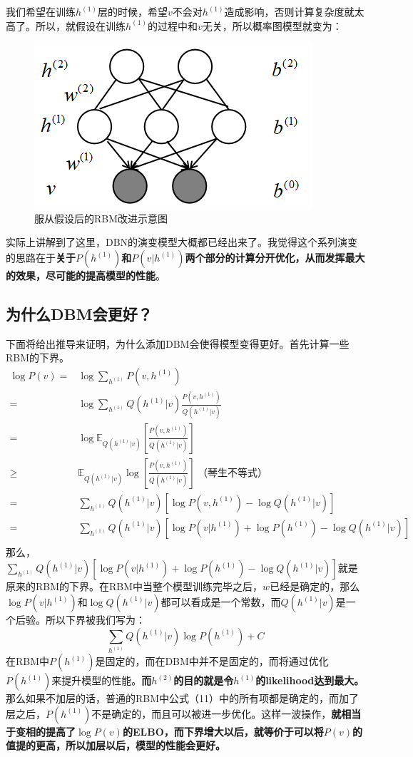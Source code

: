 \documentclass[a4paper]{article}
\begin{document}
我们希望在训练$h^{(1)}$层的时候，希望$v$不会对$h^{(1)}$造成影响，否则计算复杂度就太高了。所以，就假设在训练$h^{(1)}$的过程中和$v$无关，所以概率图模型就变为：
\begin{figure}[H]
    \centering
    \includegraphics[width=.4\textwidth]{微信图片_20200407171216.png}
    \caption{服从假设后的RBM改进示意图}
    \label{fig:my_label_1}
\end{figure}
实际上讲解到了这里，DBN的演变模型大概都已经出来了。我觉得这个系列演变的思路在于\textbf{关于$P(h^{(1)})$和$P(v| h^{(1)})$两个部分的计算分开优化，从而发挥最大的效果，尽可能的提高模型的性能}。

\subsection{为什么DBM会更好？}
下面将给出推导来证明，为什么添加DBM会使得模型变得更好。首先计算一些RBM的下界。
\begin{equation}
    \begin{split}
        \log P(v) = & \log \sum_{h^{(1)}} P(v,h^{(1)}) \\
        = & \log \sum_{h^{(1)}} Q(h^{(1)}|v) \frac{P(v,h^{(1)})}{Q(h^{(1)}|v)} \\
        = & \log \mathbb{E}_{Q(h^{(1)}|v)} \left[ \frac{P(v,h^{(1)})}{Q(h^{(1)}|v)} \right] \\
        \geq & \mathbb{E}_{Q(h^{(1)}|v)} \log \left[ \frac{P(v,h^{(1)})}{Q(h^{(1)}|v)} \right] \ \text{（琴生不等式）} \\
        = & \sum_{h^{(1)}} Q(h^{(1)}|v) \left[ \log P(v,h^{(1)}) - \log Q(h^{(1)}|v) \right] \\
        = & \sum_{h^{(1)}} Q(h^{(1)}|v) \left[ \log P(v|h^{(1)}) + \log P(h^{(1)}) - \log Q(h^{(1)}|v) \right] \\
    \end{split}
\end{equation}
那么，$\sum_{h^{(1)}} Q(h^{(1)}|v) \left[ \log P(v|h^{(1)}) + \log P(h^{(1)}) - \log Q(h^{(1)}|v) \right]$就是原来的RBM的下界。在RBM中当整个模型训练完毕之后，$w$已经是确定的，那么$\log P(v|h^{(1)})$和$\log Q(h^{(1)}|v)$都可以看成是一个常数，而$Q(h^{(1)}|v)$是一个后验。所以下界被我们写为：
\begin{equation}
    \sum_{h^{(1)}} Q(h^{(1)}|v) \log P(h^{(1)}) + C
\end{equation}
在RBM中$P(h^{(1)})$是固定的，而在DBM中并不是固定的，而将通过优化$P(h^{(1)})$来提升模型的性能。\textbf{而$h^{(2)}$的目的就是令$h^{(1)}$的likelihood达到最大。}那么如果不加层的话，普通的RBM中公式（11）中的所有项都是确定的，而加了层之后，$P(h^{(1)})$不是确定的，而且可以被进一步优化。这样一波操作，\textbf{就相当于变相的提高了$\log P(v)$的ELBO，而下界增大以后，就等价于可以将$P(v)$的值提的更高，所以加层以后，模型的性能会更好。}
 
\end{document}
